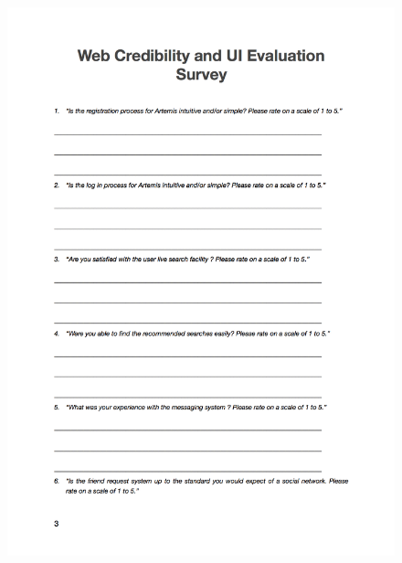 \begin{figure}[H]
	\centering
	\includegraphics[scale=.7]{chapters/appendices/figures/3.png}
	\label{fig:3/6}
\end{figure}
\newpage

